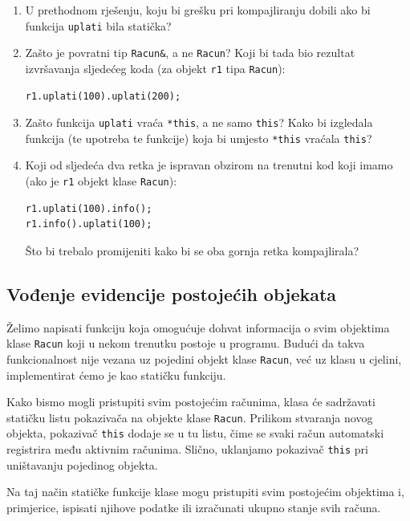 \begin{razmisljanje}
\begin{enumerate}
    \item
    U prethodnom rješenju, koju bi grešku pri kompajliranju dobili ako bi funkcija \texttt{uplati} bila statička?
    \item
    Zašto je povratni tip \texttt{Racun\&}, a ne \texttt{Racun}?
    Koji bi tada bio rezultat izvršavanja sljedećeg koda
    (za objekt \texttt{r1} tipa \texttt{Racun}):
    \begin{verbatim}
r1.uplati(100).uplati(200);
    \end{verbatim}
    \item 
    Zašto funkcija \texttt{uplati} vraća \texttt{*this}, a ne samo \texttt{this}?
    Kako bi izgledala funkcija (te upotreba te funkcije) 
    koja bi umjesto \texttt{*this} vraćala \texttt{this}?
    \item 
    Koji od sljedeća dva retka je ispravan obzirom na trenutni kod koji imamo (ako je \texttt{r1} objekt klase \texttt{Racun}):
    \begin{verbatim}
r1.uplati(100).info();
r1.info().uplati(100);
    \end{verbatim}
    Što bi trebalo promijeniti kako bi se oba gornja retka kompajlirala?
\end{enumerate}
\end{razmisljanje}


\subsection{Vođenje evidencije postojećih objekata}

Želimo napisati funkciju koja omogućuje dohvat informacija o svim objektima klase \texttt{Racun} koji u nekom trenutku postoje u programu. 
Budući da takva funkcionalnost nije vezana uz pojedini objekt klase \texttt{Racun}, već uz klasu u cjelini, implementirat ćemo je kao statičku funkciju.
\medskip

Kako bismo mogli pristupiti svim postojećim računima, klasa će sadržavati statičku listu pokazivača na objekte klase \texttt{Racun}. 
Prilikom stvaranja novog objekta, pokazivač \texttt{this} dodaje se u tu listu, čime se svaki račun automatski registrira među aktivnim računima.
Slično, uklanjamo pokazivač \texttt{this} pri uništavanju
pojedinog objekta.
\medskip

Na taj način statičke funkcije klase mogu pristupiti svim postojećim objektima i, primjerice, ispisati njihove podatke ili izračunati ukupno stanje svih računa.

